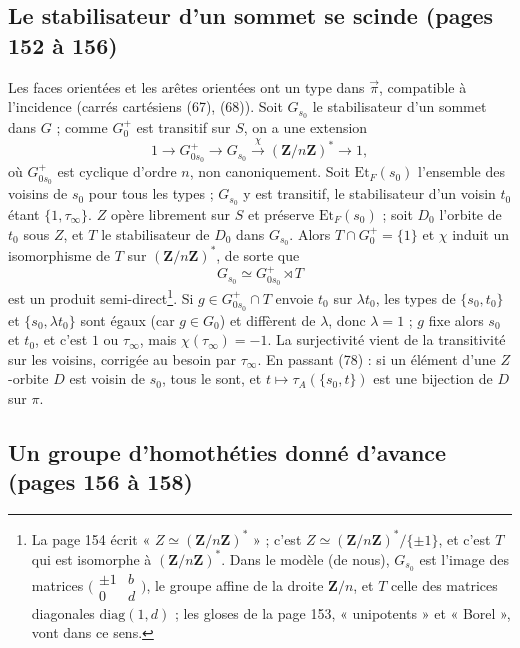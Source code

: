 \documentclass[11pt,a4paper]{article}
\begin{document}
\subsection*{Le stabilisateur d'un sommet se scinde (pages 152 à 156)}

Les faces orientées et les arêtes orientées ont un type dans
$\overrightarrow{\pi}$, compatible à l'incidence (carrés cartésiens (67),
(68)). Soit $G_{s_0}$ le stabilisateur d'un sommet dans $G$ ; comme $G_0^{+}$
est transitif sur $S$, on a une extension
\[
  1 \longrightarrow G^{+}_{0 s_0} \longrightarrow G_{s_0}
  \xrightarrow{\ \chi\ } (\mathbf{Z}/n\mathbf{Z})^{*} \longrightarrow 1 ,
\]
où $G^{+}_{0s_0}$ est cyclique d'ordre $n$, non canoniquement. Soit
$\mathrm{Et}_F(s_0)$ l'ensemble des voisins de $s_0$ pour tous les types ;
$G_{s_0}$ y est transitif, le stabilisateur d'un voisin $t_0$ étant $\{1,
\tau_\infty\}$. $Z$ opère librement sur $S$ et préserve $\mathrm{Et}_F(s_0)$ ;
soit $D_0$ l'orbite de $t_0$ sous $Z$, et $T$ le stabilisateur de $D_0$ dans
$G_{s_0}$. Alors $T \cap G_0^{+} = \{1\}$ et $\chi$ induit un isomorphisme de
$T$ sur $(\mathbf{Z}/n\mathbf{Z})^{*}$, de sorte que
\[
  G_{s_0} \simeq G^{+}_{0s_0} \rtimes T
\]
est un produit semi-direct\footnote{La page 154 écrit « $Z \simeq
(\mathbf{Z}/n\mathbf{Z})^{*}$ » ; c'est $Z \simeq
(\mathbf{Z}/n\mathbf{Z})^{*}/\{\pm 1\}$, et c'est $T$ qui est isomorphe à
$(\mathbf{Z}/n\mathbf{Z})^{*}$. Dans le modèle (de nous), $G_{s_0}$ est
l'image des matrices $\bigl(\begin{smallmatrix} \pm 1 & b \\ 0 & d
\end{smallmatrix}\bigr)$, le groupe affine de la droite $\mathbf{Z}/n$, et $T$
celle des matrices diagonales $\mathrm{diag}(1, d)$ ; les gloses de la page 153,
« unipotents » et « Borel », vont dans ce sens.}. Si $g \in G^{+}_{0s_0} \cap
T$ envoie $t_0$ sur $\lambda t_0$, les types de $\{s_0, t_0\}$ et $\{s_0,
\lambda t_0\}$ sont égaux (car $g \in G_0$) et diffèrent de $\lambda$, donc
$\lambda = 1$ ; $g$ fixe alors $s_0$ et $t_0$, et c'est $1$ ou $\tau_\infty$,
mais $\chi(\tau_\infty) = -1$. La surjectivité vient de la transitivité sur les
voisins, corrigée au besoin par $\tau_\infty$. En passant (78) : si un élément
d'une $Z$-orbite $D$ est voisin de $s_0$, tous le sont, et $t \mapsto
\tau_A(\{s_0, t\})$ est une bijection de $D$ sur $\pi$.

\subsection*{Un groupe d'homothéties donné d'avance (pages 156 à 158)}
\end{document}

